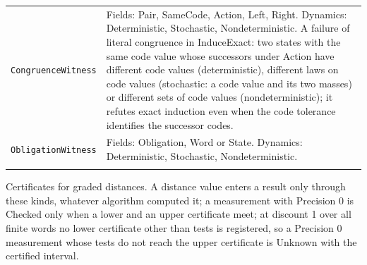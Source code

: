 \documentclass[11pt]{article}
\newcommand{\code}[1]{\texttt{#1}}
\theoremstyle{definition}
\theoremstyle{plain}
\begin{document}
{\begin{longtable}{>{\raggedright\arraybackslash}p{3.0cm}>{\raggedright\arraybackslash}p{11.4cm}}
\code{CongruenceWitness} & Fields: Pair, SameCode, Action, Left, Right. Dynamics: Deterministic, Stochastic, Nondeterministic. A failure of literal congruence in InduceExact: two states with the same code value whose successors under Action have different code values (deterministic),\allowbreak{} different laws on code values (stochastic: a code value and its two masses) or different sets of code values (nondeterministic); it refutes exact induction even when the code tolerance identifies the successor codes.\\ \addlinespace[3pt]
\code{ObligationWitness} & Fields: Obligation, Word or State. Dynamics: Deterministic, Stochastic, Nondeterministic.\\ \addlinespace[3pt]
\bottomrule\end{longtable}}
Certificates for graded distances. A distance value enters a result only through these kinds,\allowbreak{} whatever algorithm computed it; a measurement with Precision 0 is Checked only when a lower and an upper certificate meet; at discount 1 over all finite words no lower certificate other than tests is registered,\allowbreak{} so a Precision 0 measurement whose tests do not reach the upper certificate is Unknown with the certified interval.
\end{document}
